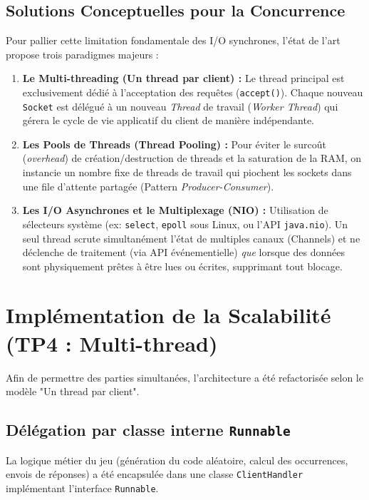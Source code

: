 \documentclass[11pt,a4paper]{article}
\begin{document}
\subsection{Solutions Conceptuelles pour la Concurrence}
Pour pallier cette limitation fondamentale des I/O synchrones, l'état de l'art propose trois paradigmes majeurs :
\begin{enumerate}
    \item \textbf{Le Multi-threading (Un thread par client) :} Le thread principal est exclusivement dédié à l'acceptation des requêtes (\texttt{accept()}). Chaque nouveau \texttt{Socket} est délégué à un nouveau \textit{Thread} de travail (\textit{Worker Thread}) qui gérera le cycle de vie applicatif du client de manière indépendante.
    \item \textbf{Les Pools de Threads (Thread Pooling) :} Pour éviter le surcoût (\textit{overhead}) de création/destruction de threads et la saturation de la RAM, on instancie un nombre fixe de threads de travail qui piochent les sockets dans une file d'attente partagée (Pattern \textit{Producer-Consumer}).
    \item \textbf{Les I/O Asynchrones et le Multiplexage (NIO) :} Utilisation de sélecteurs système (ex: \texttt{select}, \texttt{epoll} sous Linux, ou l'API \texttt{java.nio}). Un seul thread scrute simultanément l'état de multiples canaux (Channels) et ne déclenche de traitement (via API événementielle) \textit{que} lorsque des données sont physiquement prêtes à être lues ou écrites, supprimant tout blocage.
\end{enumerate}


\section{Implémentation de la Scalabilité (TP4 : Multi-thread)}

Afin de permettre des parties simultanées, l'architecture a été refactorisée selon le modèle "Un thread par client". 

\subsection{Délégation par classe interne \texttt{Runnable}}
La logique métier du jeu (génération du code aléatoire, calcul des occurrences, envois de réponses) a été encapsulée dans une classe \texttt{ClientHandler} implémentant l'interface \texttt{Runnable}.
\end{document}
